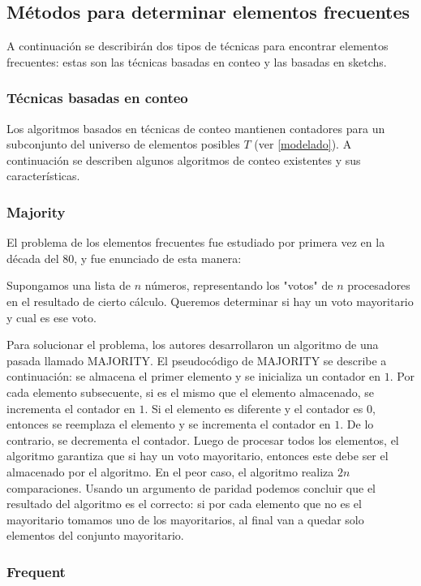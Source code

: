 \documentclass[a4paper,10pt, oneside]{article}
\begin{document}
\subsection{Métodos para determinar elementos frecuentes}
A continuación se describirán dos tipos de técnicas para encontrar elementos frecuentes: estas son las técnicas basadas en conteo y las basadas en sketchs.

\subsubsection{Técnicas basadas en conteo}

Los algoritmos basados en técnicas de conteo mantienen contadores para un subconjunto del universo de elementos posibles $T$ (ver \ref{modelado}). A continuación se describen algunos algoritmos de conteo existentes y sus características.

\subsubsection*{Majority}
El problema de los elementos frecuentes fue estudiado por primera vez en la década del 80, y fue enunciado de esta manera:
\begin{displayquote}
	Supongamos una lista de $n$ números, representando los "votos" de $n$ procesadores en el resultado de cierto cálculo. Queremos determinar si hay un voto mayoritario y cual es ese voto.\cite{GUIBAS1981208}
\end{displayquote}

Para solucionar el problema, los autores desarrollaron un algoritmo de una pasada llamado MAJORITY. El pseudocódigo de MAJORITY se describe a continuación: se almacena el primer elemento y se inicializa un contador en $1$. Por cada elemento subsecuente, si es el mismo que el elemento almacenado, se incrementa el contador en $1$. Si el elemento es diferente y el contador es $0$, entonces se reemplaza el elemento y se incrementa el contador en $1$. De lo contrario, se decrementa el contador. Luego de procesar todos los elementos, el algoritmo garantiza que si hay un voto mayoritario, entonces este debe ser el almacenado por el algoritmo. En el peor caso, el algoritmo realiza $2n$ comparaciones. Usando un argumento de paridad podemos concluir que el resultado del algoritmo es el correcto: si por cada elemento que no es el mayoritario tomamos uno de los mayoritarios, al final van a quedar solo elementos del conjunto mayoritario.

\subsubsection*{Frequent}
\end{document}
